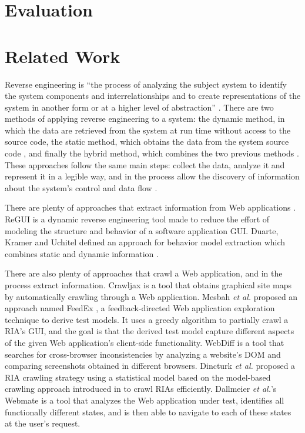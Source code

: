 \documentclass[conference]{IEEEtran}
\begin{document}
\section{Evaluation}\label{sec:eval}


\section{Related Work}\label{sec:sota}

Reverse engineering is ``the process of analyzing the subject system to identify the system components and interrelationships and to create representations of the system in another form or at a higher level of abstraction'' \cite{chikofsky1990reverse}. There are two methods of applying reverse engineering to a system: the dynamic method, in which the data are retrieved from the system at run time without access to the source code, the static method, which obtains the data from the system source code \cite{systa1999dynamic}, and finally the hybrid method, which combines the two previous methods \cite{canfora2011achievements}. These approaches follow the same main steps: collect the data, analyze it and represent it in a legible way, and in the process allow the discovery of information about the system's control and data flow \cite{pacione2003comparative}.

There are plenty of approaches that extract information from Web applications \cite{sampath2007applying,amalfitano2010rich, andjelkovic2011trace}. ReGUI \cite{coimbra2011reverse,coimbra2012dynamic} is a dynamic reverse engineering tool made to reduce the effort of modeling the structure and behavior of a software application GUI. Duarte, Kramer and Uchitel defined an approach for behavior model extraction which combines static and dynamic information \cite{duarte2006model}.

There are also plenty of approaches that crawl a Web application, and in the process extract information. Crawljax \cite{roest2010automated} is a tool that obtains graphical site maps by automatically crawling through a Web application. Mesbah \textit{et al.} proposed an approach named FeedEx \cite{fard2013feedback}, a feedback-directed Web application exploration technique to derive test models. It uses a greedy algorithm to partially crawl a RIA's GUI, and the goal is that the derived test model capture different aspects of the given Web application's client-side functionality. WebDiff \cite{choudhary2010Webdiff} is a tool that searches for cross-browser inconsistencies by analyzing a website's DOM and comparing screenshots obtained in different browsers. Dincturk \textit{et al.} \cite{dincturk2012statistical} proposed a RIA crawling strategy using a statistical model based on the model-based crawling approach introduced in \cite{benjamin2011strategy} to crawl RIAs efficiently. Dallmeier \textit{et al.}'s Webmate \cite{dallmeier2012Webmate,dallmeier2013Webmate} is a tool that analyzes the Web application under test, identifies all functionally different states, and is then able to navigate to each of these states at the user’s request.
\end{document}
